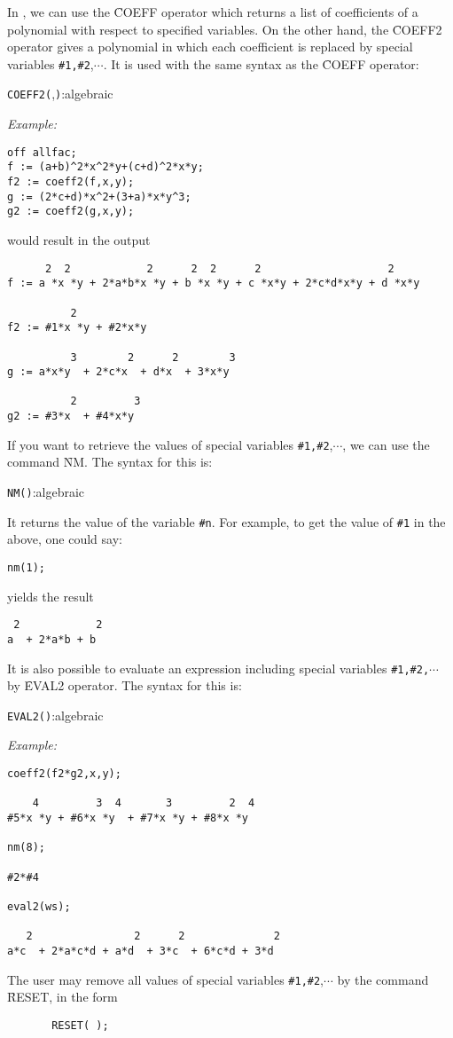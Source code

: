 In \REDUCE,  we can use the \f{COEFF} operator which returns a list of coefficients of a polynomial
with respect to  specified variables. 
On the other hand, the \f{COEFF2} operator gives a polynomial in which each coefficient is replaced by
special variables \verb|#1,#2|,$\cdots$. It is used with the same syntax as the \f{COEFF} operator:
\begin{syntax}
        \texttt{COEFF2(},\texttt{)}:algebraic
\end{syntax}
\textit{Example:}
\begin{verbatim}
off allfac;
f := (a+b)^2*x^2*y+(c+d)^2*x*y;
f2 := coeff2(f,x,y);
g := (2*c+d)*x^2+(3+a)*x*y^3;
g2 := coeff2(g,x,y);
\end{verbatim}
would result in the output
\begin{verbatim}
      2  2            2      2  2      2                    2
f := a *x *y + 2*a*b*x *y + b *x *y + c *x*y + 2*c*d*x*y + d *x*y

          2
f2 := #1*x *y + #2*x*y

          3        2      2        3
g := a*x*y  + 2*c*x  + d*x  + 3*x*y

          2         3
g2 := #3*x  + #4*x*y
\end{verbatim}
If you want to retrieve the values of  special variables \verb|#1,#2|,$\cdots$,
we can use the command \f{NM}. The syntax for this is:
\begin{syntax}
        \texttt{NM(}\texttt{)}:algebraic
\end{syntax}
It returns the value of the variable \verb|#n|. For example, to get the value of 
\verb|#1| in the above, one could say:
\begin{verbatim}
nm(1);
\end{verbatim}
yields the result
\begin{verbatim}
 2            2
a  + 2*a*b + b
\end{verbatim}
It is also possible to evaluate an expression including  special variables \verb|#1,#2,|$\cdots$
by \f{EVAL2} operator.
The syntax for this is:
\begin{syntax}
        \texttt{EVAL2(}\texttt{)}:algebraic
\end{syntax}
\textit{Example:}
\begin{verbatim}
coeff2(f2*g2,x,y);

    4         3  4       3         2  4
#5*x *y + #6*x *y  + #7*x *y + #8*x *y

nm(8);

#2*#4

eval2(ws);

   2                2      2              2
a*c  + 2*a*c*d + a*d  + 3*c  + 6*c*d + 3*d

\end{verbatim}
The user may remove all values of special variables \verb|#1,#2|,$\cdots$
by the command \f{RESET}, in the form
\begin{verbatim}
       RESET( );
\end{verbatim}

